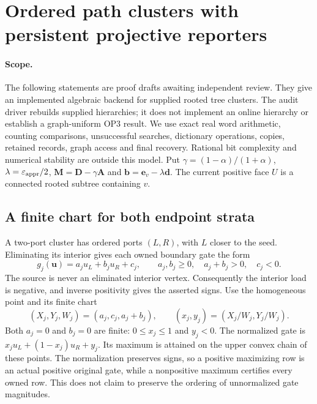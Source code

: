 \section[Ordered path clusters and projective reporters]{Ordered path clusters with persistent projective reporters}
\label{sec:op3-ordered-path-clusters}

\paragraph{Scope.}
The following \statusproved{} statements are proof drafts awaiting independent
review. They give an implemented algebraic backend for supplied rooted tree
clusters. The audit driver rebuilds supplied hierarchies; it does not implement
an online hierarchy or establish a graph-uniform OP3 result. We use exact real
word arithmetic, counting comparisons, unsuccessful searches, dictionary
operations, copies, retained records, graph access and final recovery.
Rational bit complexity and numerical stability are outside this model.
Put $\gamma=(1-\alpha)/(1+\alpha)$, $\lambda=\varepsilon_{\mathrm{appr}}/2$,
$\boldsymbol M=\boldsymbol D-\gamma\boldsymbol A$ and
$\boldsymbol b=\boldsymbol e_v-\lambda\boldsymbol d$.
The current positive face $U$ is a connected rooted subtree containing $v$.

\subsection{A finite chart for both endpoint strata}

A two-port cluster has ordered ports $(L,R)$, with $L$ closer to the seed.
Eliminating its interior gives each owned boundary gate the form
\[
 g_j(\boldsymbol u)=a_j u_L+b_j u_R+c_j,
 \qquad a_j,b_j\geq0,\quad a_j+b_j>0,\quad c_j<0.
\]
The source is never an eliminated interior vertex. Consequently the interior
load is negative, and inverse positivity gives the asserted signs.
Use the homogeneous point and its finite chart
\begin{equation}
 (X_j,Y_j,W_j)=(a_j,c_j,a_j+b_j),\qquad
 (x_j,y_j)=(X_j/W_j,Y_j/W_j).
 \label{eq:op3-compact-projective-chart}
\end{equation}
Both $a_j=0$ and $b_j=0$ are finite: $0\leq x_j\leq1$ and $y_j<0$.
The normalized gate is $x_j u_L+(1-x_j)u_R+y_j$. Its maximum is attained
on the upper convex chain of these points. The normalization preserves signs,
so a positive maximizing row is an actual positive original gate, while a
nonpositive maximum certifies every owned row. This does not claim to preserve
the ordering of unnormalized gate magnitudes.

